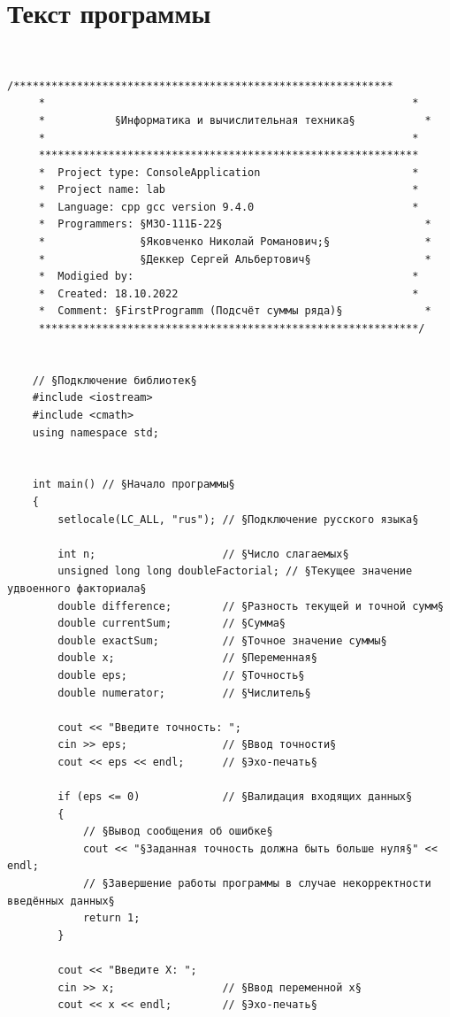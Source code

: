 \documentclass[a4paper]{article}
\begin{document}
	\newpage
	
	\section{Текст программы}
	
	\
	\begin{lstlisting}[style={CppCodeStyle}]
	/************************************************************
 	 *                                                          *
 	 *           §Информатика и вычислительная техника§           *
 	 *                                                          *
 	 ************************************************************
 	 *  Project type: ConsoleApplication                        *
 	 *  Project name: lab                                       *
 	 *  Language: cpp gcc version 9.4.0                         *
	 *  Programmers: §М3О-111Б-22§                                *
	 *               §Яковченко Николай Романович;§               *
	 *               §Деккер Сергей Альбертович§                  *
	 *  Modigied by:                                            *
	 *  Created: 18.10.2022                                     *
	 *  Comment: §FirstProgramm (Подсчёт суммы ряда)§             *
	 ************************************************************/
		
		
	// §Подключение библиотек§
	#include <iostream>
	#include <cmath>
	using namespace std;
	
	
	int main() // §Начало программы§
	{
		setlocale(LC_ALL, "rus"); // §Подключение русского языка§
		
		int n;                    // §Число слагаемых§
		unsigned long long doubleFactorial; // §Текущее значение удвоенного факториала§
		double difference;        // §Разность текущей и точной сумм§
		double currentSum;        // §Сумма§
		double exactSum;          // §Точное значение суммы§
		double x;                 // §Переменная§
		double eps;               // §Точность§
		double numerator;         // §Числитель§
		
		cout << "Введите точность: ";
		cin >> eps;               // §Ввод точности§
		cout << eps << endl;      // §Эхо-печать§
		
		if (eps <= 0)             // §Валидация входящих данных§
		{
			// §Вывод сообщения об ошибке§
			cout << "§Заданная точность должна быть больше нуля§" << endl; 
			// §Завершение работы программы в случае некорректности введённых данных§
			return 1;
		}
		
		cout << "Введите X: ";
		cin >> x;                 // §Ввод переменной x§
		cout << x << endl;        // §Эхо-печать§
		

\end{lstlisting}
\end{document}
